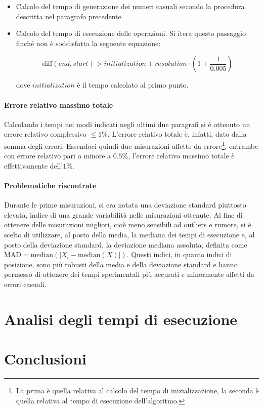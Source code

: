 \documentclass{article}
\begin{document}
	\begin{itemize}
		\item Calcolo del tempo di generazione dei numeri casuali secondo la procedura descritta nel paragrafo precedente
		\item Calcolo del tempo di esecuzione delle operazioni. Si itera questo passaggio finché non è soddisfatta la seguente equazione:
		
			\[
				\text{diff}\left(end, start\right) > initialization + resolution \cdot \left(1+\frac{1}{0.005}\right)  
			\]
			
			dove $initialization$ è il tempo calcolato al primo punto.
	\end{itemize}
	
	\newpage
	
	\paragraph{Errore relativo massimo totale}
	Calcolando i tempi nei modi indicati negli ultimi due paragrafi si è ottenuto un errore relativo complessivo $\leq1\%$. L'errore relativo totale è, infatti, dato dalla somma degli errori. Essendoci quindi due misurazioni affette da errore\footnote{La prima è quella relativa al calcolo del tempo di inizializzazione, la seconda è quella relativa al tempo di esecuzione dell'algoritmo.}, entrambe con errore relativo pari o minore a $0.5\%$, l'errore relativo massimo totale è effettivamente dell'$1\%$.
	
	\paragraph{Problematiche riscontrate}
	Durante le prime misurazioni, si era notata una deviazione standard piuttosto elevata, indice di una grande variabilità nelle misurazioni ottenute. Al fine di ottenere delle misurazioni migliori, cioè meno sensibili ad outliers e rumore, si è scelto di utilizzare, al posto della media, la mediana dei tempi di esecuzione e, al posto della deviazione standard, la deviazione mediana assoluta, definita come $\textrm{MAD}=\textrm{median}\left(\mathopen|X_{i}-\textrm{median}\left(X\right)\mathclose|\right)$. Questi indici, in quanto indici di posizione, sono più robusti della media e della deviazione standard e hanno permesso di ottenere dei tempi sperimentali più accurati e minormente affetti da errori casuali.
	
	\newpage	
	\section{Analisi degli tempi di esecuzione}
	
	
	\newpage

	\section{Conclusioni}
	
	
\end{document}
